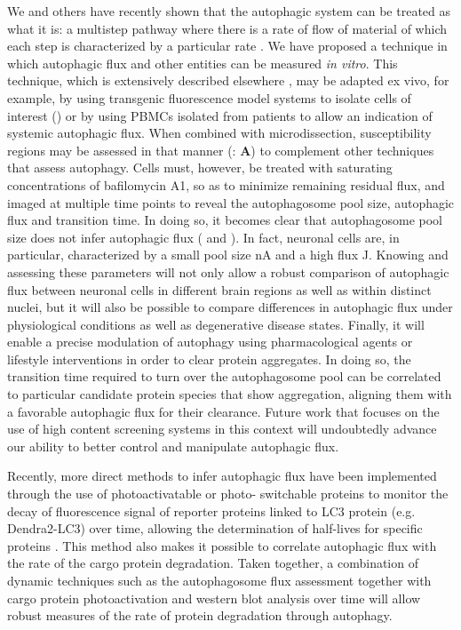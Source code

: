 We and others have recently shown that the autophagic system can be treated as what it is: a multistep pathway where there is a rate of flow of material of which each step is characterized by a particular rate \citep{Meijer2009,loos2014}. We have proposed a technique in which autophagic flux and other entities can be measured \textit{in vitro}. This technique, which is extensively described elsewhere \citep{loos2014}, may be adapted ex vivo, for example, by using transgenic fluorescence model systems \citep{Mizushima2004a} to isolate cells of interest () or by using PBMCs isolated from patients \citep{Rangwala2014} to allow an indication of systemic autophagic flux. When combined with microdissection, susceptibility regions may be assessed in that manner (: \textbf{A}) to complement other techniques that assess autophagy. Cells must, however, be treated with saturating concentrations of bafilomycin A1, so as to minimize remaining residual flux, and imaged at multiple time points to reveal the autophagosome pool size, autophagic flux and transition time. In doing so, it becomes clear that autophagosome pool size does not infer autophagic flux ( and ). In fact, neuronal cells are, in particular, characterized by a small pool size nA and a high flux J. Knowing and assessing these parameters will not only allow a robust comparison of autophagic flux between neuronal cells in different brain regions as well as within distinct nuclei, but it will also be possible to compare differences in autophagic flux under physiological conditions as well as degenerative disease states. Finally, it will enable a precise modulation of autophagy using pharmacological agents or lifestyle interventions in order to clear protein aggregates. In doing so, the transition time required to turn over the autophagosome pool can be correlated to particular candidate protein species that show aggregation, aligning them with a favorable autophagic flux for their clearance. Future work that focuses on the use of high content screening systems in this context will undoubtedly advance our ability to better control and manipulate autophagic flux. 

Recently, more direct methods to infer autophagic flux have been implemented through the use of photoactivatable or photo- switchable proteins to monitor the decay of fluorescence signal of reporter proteins linked to LC3 protein (e.g. Dendra2-LC3) over time, allowing the determination of half-lives for specific proteins \citep{Tsvetkov2013}. This method also makes it possible to correlate autophagic flux with the rate of the cargo protein degradation. Taken together, a combination of dynamic techniques such as the autophagosome flux assessment together with cargo protein photoactivation and western blot analysis over time will allow robust measures of the rate of protein degradation through autophagy.

